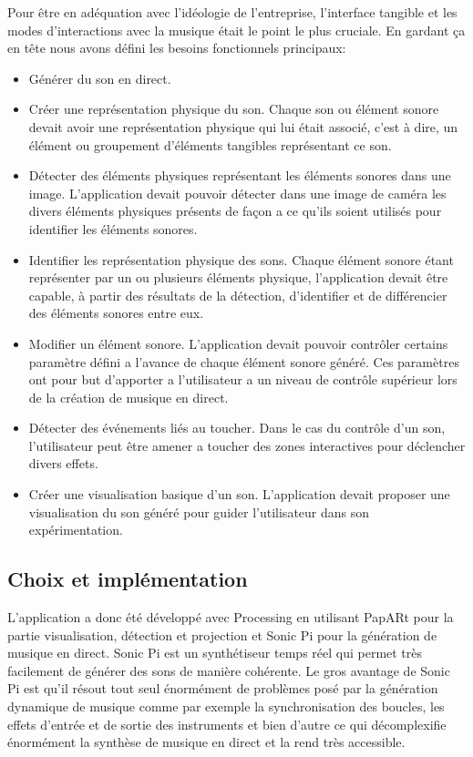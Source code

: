 Pour être en adéquation avec l'idéologie de l'entreprise, l'interface tangible et les modes d'interactions avec la musique était le point le plus cruciale. 
En gardant ça en tête nous avons défini les besoins fonctionnels principaux:
\begin{itemize}
\item Générer du son en direct.
\item Créer une représentation physique du son. Chaque son ou élément sonore devait avoir une représentation physique qui lui était associé, c'est à dire, un élément ou groupement d'éléments tangibles représentant ce son.
\item Détecter des éléments physiques représentant les éléments sonores dans une image. L'application devait pouvoir détecter dans une image de caméra les divers éléments physiques présents de façon a ce qu'ils soient utilisés pour identifier les éléments sonores.
\item Identifier les représentation physique des sons. Chaque élément sonore étant représenter par un ou plusieurs éléments physique, l'application devait être capable, à partir des résultats de la détection, d'identifier et de différencier des éléments sonores entre eux. 
\item Modifier un élément sonore. L'application devait pouvoir contrôler certains paramètre défini a l'avance de chaque élément sonore généré. Ces paramètres ont pour but d'apporter a l'utilisateur a un niveau de contrôle supérieur lors de la création de musique en direct.
\item Détecter des événements liés au toucher. Dans le cas du contrôle d'un son, l'utilisateur peut être amener a toucher des zones interactives pour déclencher divers effets.
\item Créer une visualisation basique d'un son. L'application devait proposer une visualisation du son généré pour guider l'utilisateur dans son expérimentation.
\end{itemize}

\subsection{Choix et implémentation}
\label{subsec:reartable:impl}
L'application a donc été développé avec Processing en utilisant PapARt pour la partie visualisation, détection et projection et Sonic Pi pour la génération de musique en direct.
Sonic Pi est un synthétiseur temps réel qui permet très facilement de générer des sons de manière cohérente. Le gros avantage de Sonic Pi est qu'il résout tout seul énormément de problèmes posé par la génération dynamique de musique comme par exemple la synchronisation des boucles, les effets d'entrée et de sortie des instruments et bien d'autre ce qui décomplexifie énormément la synthèse de musique en direct et la rend très accessible.

